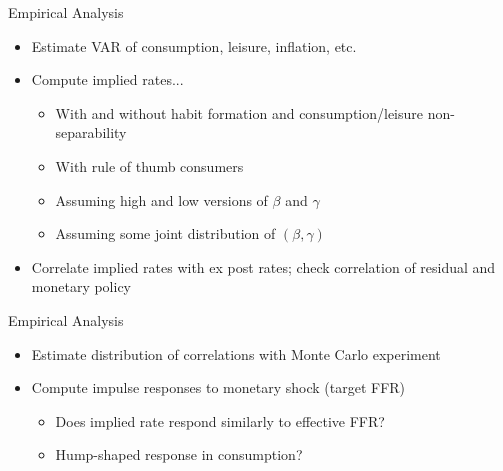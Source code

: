 \documentclass{beamer}
\begin{document}
\begin{frame}{Empirical Analysis}
\begin{itemize}
\item Estimate VAR of consumption, leisure, inflation, etc.
\item Compute implied rates...
    \begin{itemize}
    \item With and without habit formation and consumption/leisure non-separability
    \item With rule of thumb consumers
    \item Assuming high and low versions of $\beta$ and $\gamma$
    \item Assuming some joint distribution of $(\beta, \gamma)$
    \end{itemize}
\item Correlate implied rates with ex post rates; check correlation of residual and monetary policy
\end{itemize}
\end{frame}

\begin{frame}{Empirical Analysis}
\begin{itemize}
\item Estimate distribution of correlations with Monte Carlo experiment
\item Compute impulse responses to monetary shock (target FFR)
    \begin{itemize}
    \item Does implied rate respond similarly to effective FFR?
    \item Hump-shaped response in consumption?
    \end{itemize}
\end{itemize}
\end{frame}


\end{document}
